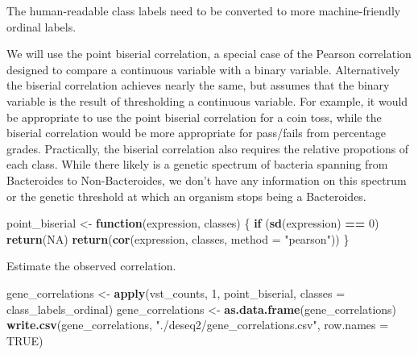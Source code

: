 \documentclass[
]{book}
\newenvironment{Shaded}{\begin{snugshade}}{\end{snugshade}}
\newcommand{\AttributeTok}[1]{\textcolor[rgb]{0.13,0.29,0.53}{#1}}
\newcommand{\ConstantTok}[1]{\textcolor[rgb]{0.56,0.35,0.01}{#1}}
\newcommand{\ControlFlowTok}[1]{\textcolor[rgb]{0.13,0.29,0.53}{\textbf{#1}}}
\newcommand{\DecValTok}[1]{\textcolor[rgb]{0.00,0.00,0.81}{#1}}
\newcommand{\FunctionTok}[1]{\textcolor[rgb]{0.13,0.29,0.53}{\textbf{#1}}}
\newcommand{\NormalTok}[1]{#1}
\newcommand{\OtherTok}[1]{\textcolor[rgb]{0.56,0.35,0.01}{#1}}
\newcommand{\SpecialCharTok}[1]{\textcolor[rgb]{0.81,0.36,0.00}{\textbf{#1}}}
\newcommand{\StringTok}[1]{\textcolor[rgb]{0.31,0.60,0.02}{#1}}
\begin{document}
The human-readable class labels need to be converted to more machine-friendly ordinal labels.

\begin{Shaded}
\end{Shaded}

We will use the point biserial correlation, a special case of the Pearson correlation designed to compare a continuous variable with a binary variable.
Alternatively the biserial correlation achieves nearly the same, but assumes that the binary variable is the result of thresholding a continuous variable.
For example, it would be appropriate to use the point biserial correlation for a coin toss, while the biserial correlation would be more appropriate for pass/fails from percentage grades.
Practically, the biserial correlation also requires the relative propotions of each class. While there likely is a genetic spectrum of bacteria spanning
from Bacteroides to Non-Bacteroides, we don't have any information on this spectrum or the genetic threshold at which an organism stops being a Bacteroides.

\begin{Shaded}
\begin{Highlighting}[numbers=left,,]
\NormalTok{point\_biserial }\OtherTok{\textless{}{-}} \ControlFlowTok{function}\NormalTok{(expression, classes) \{}
  \ControlFlowTok{if}\NormalTok{ (}\FunctionTok{sd}\NormalTok{(expression) }\SpecialCharTok{==} \DecValTok{0}\NormalTok{) }\FunctionTok{return}\NormalTok{(}\ConstantTok{NA}\NormalTok{)}
  \FunctionTok{return}\NormalTok{(}\FunctionTok{cor}\NormalTok{(expression, classes, }\AttributeTok{method =} \StringTok{"pearson"}\NormalTok{))}
\NormalTok{\}}
\end{Highlighting}
\end{Shaded}

Estimate the observed correlation.

\begin{Shaded}
\begin{Highlighting}[numbers=left,,]
\NormalTok{gene\_correlations }\OtherTok{\textless{}{-}} \FunctionTok{apply}\NormalTok{(vst\_counts, }\DecValTok{1}\NormalTok{, point\_biserial, }\AttributeTok{classes =}\NormalTok{ class\_labels\_ordinal)}
\NormalTok{gene\_correlations }\OtherTok{\textless{}{-}} \FunctionTok{as.data.frame}\NormalTok{(gene\_correlations)}
\FunctionTok{write.csv}\NormalTok{(gene\_correlations, }\StringTok{"./deseq2/gene\_correlations.csv"}\NormalTok{, }\AttributeTok{row.names =} \ConstantTok{TRUE}\NormalTok{)}
\end{Highlighting}
\end{Shaded}
\end{document}

